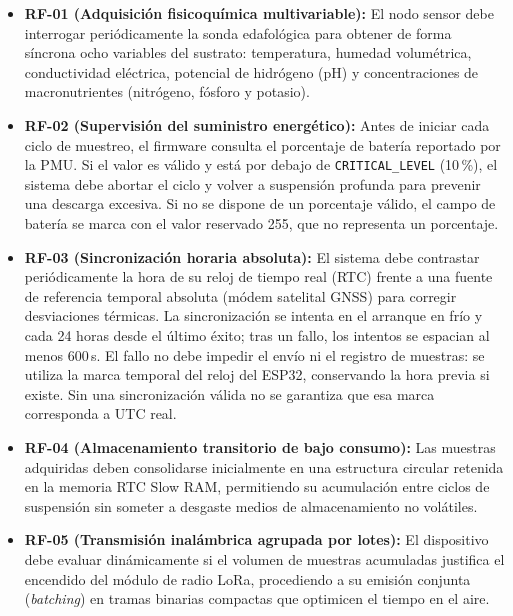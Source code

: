 \begin{itemize}
    \item \textbf{RF-01 (Adquisición fisicoquímica multivariable):} El nodo sensor debe interrogar periódicamente la sonda edafológica para obtener de forma síncrona ocho variables del sustrato: temperatura, humedad volumétrica, conductividad eléctrica, potencial de hidrógeno (pH) y concentraciones de macronutrientes (nitrógeno, fósforo y potasio).
    \item \textbf{RF-02 (Supervisión del suministro energético):} Antes de iniciar cada ciclo de muestreo, el firmware consulta el porcentaje de batería reportado por la PMU. Si el valor es válido y está por debajo de \texttt{CRITICAL\_LEVEL} (10\,\%), el sistema debe abortar el ciclo y volver a suspensión profunda para prevenir una descarga excesiva. Si no se dispone de un porcentaje válido, el campo de batería se marca con el valor reservado 255, que no representa un porcentaje.
    \item \textbf{RF-03 (Sincronización horaria absoluta):} El sistema debe contrastar periódicamente la hora de su reloj de tiempo real (RTC) frente a una fuente de referencia temporal absoluta (módem satelital GNSS) para corregir desviaciones térmicas. La sincronización se intenta en el arranque en frío y cada 24 horas desde el último éxito; tras un fallo, los intentos se espacian al menos 600\,s. El fallo no debe impedir el envío ni el registro de muestras: se utiliza la marca temporal del reloj del ESP32, conservando la hora previa si existe. Sin una sincronización válida no se garantiza que esa marca corresponda a UTC real.
    \item \textbf{RF-04 (Almacenamiento transitorio de bajo consumo):} Las muestras adquiridas deben consolidarse inicialmente en una estructura circular retenida en la memoria RTC Slow RAM, permitiendo su acumulación entre ciclos de suspensión sin someter a desgaste medios de almacenamiento no volátiles.
    \item \textbf{RF-05 (Transmisión inalámbrica agrupada por lotes):} El dispositivo debe evaluar dinámicamente si el volumen de muestras acumuladas justifica el encendido del módulo de radio LoRa, procediendo a su emisión conjunta (\textit{batching}) en tramas binarias compactas que optimicen el tiempo en el aire.

\end{itemize}
